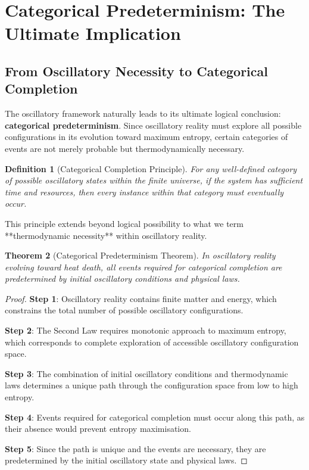 \documentclass[11pt]{article}
\newtheorem{theorem}{Theorem}[section]
\newtheorem{definition}[theorem]{Definition}
\theoremstyle{remark}
\begin{document}
\section{Categorical Predeterminism: The Ultimate Implication}

\subsection{From Oscillatory Necessity to Categorical Completion}

The oscillatory framework naturally leads to its ultimate logical conclusion: \textbf{categorical predeterminism}. Since oscillatory reality must explore all possible configurations in its evolution toward maximum entropy, certain categories of events are not merely probable but thermodynamically necessary.

\begin{definition}[Categorical Completion Principle]
For any well-defined category of possible oscillatory states within the finite universe, if the system has sufficient time and resources, then every instance within that category must eventually occur.
\end{definition}

This principle extends beyond logical possibility to what we term **thermodynamic necessity** within oscillatory reality.

\begin{theorem}[Categorical Predeterminism Theorem]
In oscillatory reality evolving toward heat death, all events required for categorical completion are predetermined by initial oscillatory conditions and physical laws.
\end{theorem}

\begin{proof}
\textbf{Step 1}: Oscillatory reality contains finite matter and energy, which constrains the total number of possible oscillatory configurations.

\textbf{Step 2}: The Second Law requires monotonic approach to maximum entropy, which corresponds to complete exploration of accessible oscillatory configuration space.

\textbf{Step 3}: The combination of initial oscillatory conditions and thermodynamic laws determines a unique path through the configuration space from low to high entropy.

\textbf{Step 4}: Events required for categorical completion must occur along this path, as their absence would prevent entropy maximisation.

\textbf{Step 5}: Since the path is unique and the events are necessary, they are predetermined by the initial oscillatory state and physical laws.
\end{proof}
\end{document}

